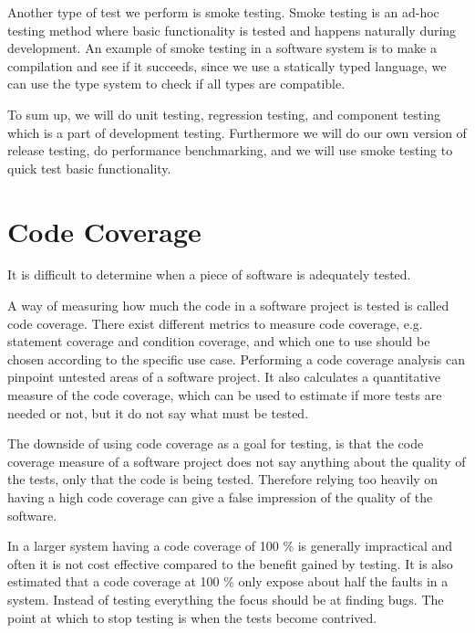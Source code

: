 \bigskip

Another type of test we perform is smoke testing.
Smoke testing is an ad-hoc testing method where basic functionality is tested and happens naturally during development\cite{smoke_testing}.
An example of smoke testing in a software system is to make a compilation and see if it succeeds, since we use a statically typed language,
we can use the type system to check if all types are compatible.

To sum up, we will do unit testing, regression testing, and component testing which is a part of development testing.
Furthermore we will do our own version of release testing, do performance benchmarking,
and we will use smoke testing to quick test basic functionality.

\section{Code Coverage}\label{sec:code_coverage}
It is difficult to determine when a piece of software is adequately tested.

A way of measuring how much the code in a software project is tested is called code coverage.
There exist different metrics to measure code coverage, e.g. statement coverage and condition coverage,
and which one to use should be chosen according to the specific use case.
Performing a code coverage analysis can pinpoint untested areas of a software project.
It also calculates a quantitative measure of the code coverage,
which can be used to estimate if more tests are needed or not,
but it do not say what must be tested.\cite{code_coverage}

The downside of using code coverage as a goal for testing,
is that the code coverage measure of a software project does not say anything about the quality of the tests,
only that the code is being tested.
Therefore relying too heavily on having a high code coverage can give a false impression of the quality of the software.\cite{code_coverage_neg}

In a larger system having a code coverage of 100 \% is generally impractical and often it is not cost effective compared to the benefit gained by testing.
It is also estimated that a code coverage at 100 \% only expose about half the faults in a system.
Instead of testing everything the focus should be at finding bugs.
The point at which to stop testing is when the tests become contrived.\cite{code_coverage_not_100}

\bigskip

